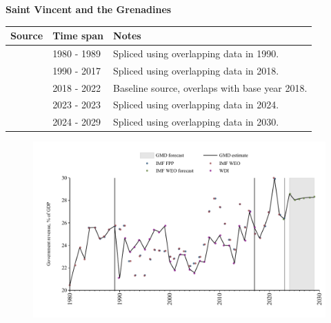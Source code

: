 \documentclass[12pt,a4paper,landscape]{article}
\begin{document}
\begin{adjustbox}{max totalsize={\paperwidth}{\paperheight},center}
\begin{minipage}[t][\textheight][t]{\textwidth}
\vspace*{0.5cm}
{}
\begin{center}
{\Large\bfseries Saint Vincent and the Grenadines}
\end{center}
\vspace{0.5cm}
\begin{table}[H]
\centering
\small
\begin{tabular}{|l|l|l|}
\hline
\textbf{Source} & \textbf{Time span} & \textbf{Notes} \\
\hline
\rowcolor{white}\cite{IMF_WEO}& 1980 - 1989 &Spliced using overlapping data in 1990.\\
\rowcolor{lightgray}\cite{WDI}& 1990 - 2017 &Spliced using overlapping data in 2018.\\
\rowcolor{white}\cite{IMF_WEO}& 2018 - 2022 &Baseline source, overlaps with base year 2018.\\
\rowcolor{lightgray}\cite{IMF_FPP}& 2023 - 2023 &Spliced using overlapping data in 2024.\\
\rowcolor{white}\cite{IMF_WEO_forecast}& 2024 - 2029 &Spliced using overlapping data in 2030.\\
\hline
\end{tabular}
\end{table}
\begin{figure}[H]
\centering
\includegraphics[width=\textwidth,height=0.6\textheight,keepaspectratio]{graphs/VCT_govrev_GDP.pdf}
\end{figure}
\end{minipage}
\end{adjustbox}
\end{document}
